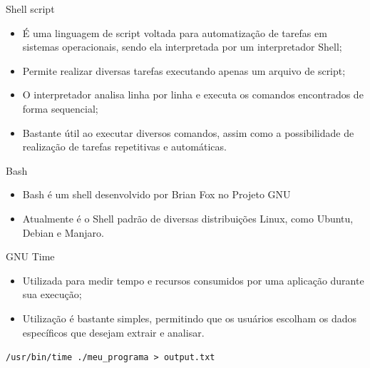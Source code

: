 \begin{frame}{Shell script}
    \begin{itemize}
        \item É uma linguagem de script voltada para automatização de tarefas em sistemas operacionais, sendo ela interpretada por um interpretador Shell;
        \item Permite realizar diversas tarefas executando apenas um arquivo de script;
        \item O interpretador analisa linha por linha e executa os comandos encontrados de forma sequencial;
        \item Bastante útil ao executar diversos comandos, assim como a possibilidade de realização de tarefas repetitivas e automáticas.
    \end{itemize}
\end{frame}

\begin{frame}{Bash}
    \begin{itemize}
        \item Bash é um shell desenvolvido por Brian Fox no Projeto GNU
        \item Atualmente é o Shell padrão de diversas distribuições Linux, como Ubuntu, Debian e Manjaro.
    \end{itemize}
\end{frame}

\begin{frame}{GNU Time}
    \begin{itemize}
        \item Utilizada para medir tempo e recursos consumidos por uma aplicação durante sua execução;
        \item Utilização é bastante simples, permitindo que os usuários escolham os dados específicos que desejam extrair e analisar.
    \end{itemize}
    
    \begin{center}
        \texttt{/usr/bin/time ./meu\_programa > output.txt}
    \end{center}
\end{frame}

